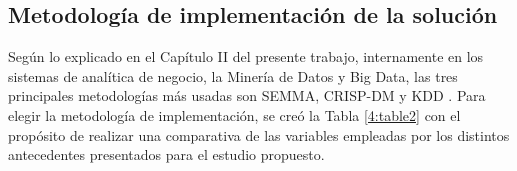 \subsection{Metodología de implementación de la solución}
 
Según lo explicado en el Capítulo II del presente trabajo, internamente en los sistemas de
analítica de negocio, la Minería de Datos y Big Data, las tres principales metodologías más usadas son
SEMMA, CRISP-DM y KDD \parencite{tec_braulio2015metodologiasdm}. Para elegir la
metodología de implementación, se creó la Tabla \ref{4:table2} con el propósito de  realizar una comparativa de las variables empleadas por los distintos antecedentes presentados para el estudio propuesto.
 
\vspace{2ex}
\begingroup
\renewcommand\arraystretch{1.2}
\small
